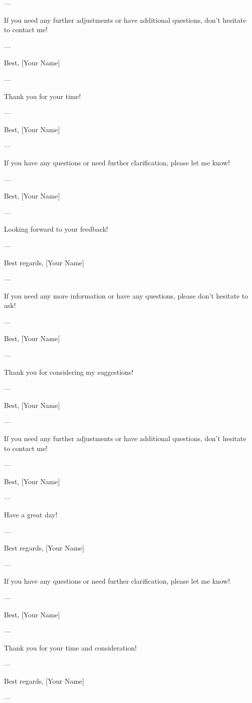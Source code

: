 --- 

If you need any further adjustments or have additional questions, don't hesitate to contact me! 

--- 

Best,  
[Your Name]  

--- 

Thank you for your time! 

--- 

Best,  
[Your Name]  

--- 

If you have any questions or need further clarification, please let me know! 

--- 

Best,  
[Your Name]  

--- 

Looking forward to your feedback! 

--- 

Best regards,  
[Your Name]  

--- 

If you need any more information or have any questions, please don't hesitate to ask! 

--- 

Best,  
[Your Name]  

--- 

Thank you for considering my suggestions! 

--- 

Best,  
[Your Name]  

--- 

If you need any further adjustments or have additional questions, don't hesitate to contact me! 

--- 

Best,  
[Your Name]  

--- 

Have a great day! 

--- 

Best regards,  
[Your Name]  

--- 

If you have any questions or need further clarification, please let me know! 

--- 

Best,  
[Your Name]  

--- 

Thank you for your time and consideration! 

--- 

Best regards,  
[Your Name]  

--- 

